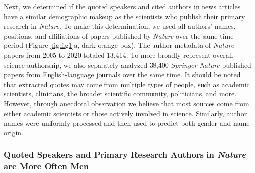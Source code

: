 Next, we determined if the quoted speakers and cited authors in news articles have a similar demographic makeup as the scientists who publish their primary research in \emph{Nature}.
To make this determination, we used all authors' names, positions, and affiliations of papers published by \emph{Nature} over the same time period (Figure \ref{fig:fig1}a, dark orange box).
The author metadata of \emph{Nature} papers from 2005 to 2020 totaled 13,414.
To more broadly represent overall science authorship, we also separately analyzed 38,400 \emph{Springer Nature}-published papers from English-language journals over the same time.
It should be noted that extracted quotes may come from multiple types of people, such as academic scientists, clinicians, the broader scientific community, politicians, and more.
However, through anecdotal observation we believe that most sources come from either academic scientists or those actively involved in science.
Similarly, author names were uniformly processed and then used to predict both gender and name origin.

\hypertarget{quoted-speakers-and-primary-research-authors-in-nature-are-more-often-men}{%
\subsubsection{\texorpdfstring{Quoted Speakers and Primary Research Authors in \emph{Nature} are More Often Men}{Quoted Speakers and Primary Research Authors in Nature are More Often Men}}\label{quoted-speakers-and-primary-research-authors-in-nature-are-more-often-men}}

